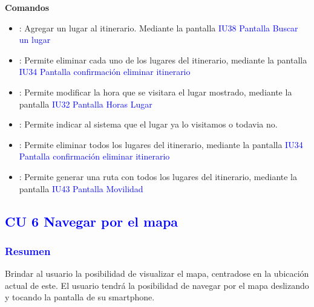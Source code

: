 \textbf{Comandos}

\begin{itemize}
    \item \fbox{+}: Agregar un lugar al itinerario. Mediante la pantalla \textcolor{blue}{IU38 Pantalla Buscar un lugar}
    
    \item {}: Permite eliminar cada uno de los lugares del itinerario, mediante la pantalla \textcolor{blue}{IU34 Pantalla confirmación eliminar itinerario}
    \item {}: Permite modificar la hora que se visitara el lugar mostrado, mediante la pantalla \textcolor{blue}{IU32 Pantalla Horas Lugar}
    \item {}: Permite indicar al sistema que el lugar ya lo visitamos o todavia no.
    \item {}: Permite eliminar todos los lugares del itinerario, mediante la pantalla \textcolor{blue}{IU34 Pantalla confirmación eliminar itinerario}
    \item {}: Permite generar una ruta con todos los lugares del itinerario, mediante la pantalla \textcolor{blue}{IU43 Pantalla Movilidad}
\end{itemize}

\newpage



\subsection{\textcolor{blue}{CU 6 Navegar por el mapa}}
\subsubsection{\textcolor{blue}{Resumen}}
Brindar al usuario la posibilidad de visualizar el mapa, centradose en la ubicación actual de este. El usuario tendrá la posibilidad de navegar por el mapa deslizando y tocando la pantalla de su smartphone.
